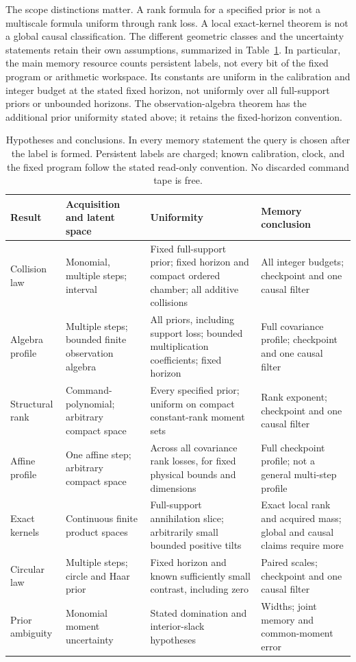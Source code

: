 The scope distinctions matter. A rank formula for a specified prior
is not a multiscale formula uniform through rank loss. A local
exact-kernel theorem is not a global causal classification. The
different geometric classes and the uncertainty statements retain their
own assumptions, summarized in Table~\ref{tab:scope}. In particular,
the main memory resource counts persistent labels, not every bit of
the fixed program or arithmetic workspace. Its constants are uniform
in the calibration and integer budget at the stated fixed horizon,
not uniformly over all full-support priors or unbounded horizons.
The observation-algebra theorem has the additional prior uniformity
stated above; it retains the fixed-horizon convention.

\begin{table}[tbp]
\centering\footnotesize
\setlength{\tabcolsep}{4pt}
\begin{tabular}{@{}p{}p{}p{}p{}@{}}
\toprule
Result & Acquisition and latent space & Uniformity & Memory conclusion\\
\midrule
Collision law & Monomial, multiple steps; interval & Fixed full-support
prior; fixed horizon and compact ordered chamber; all additive collisions
& All integer budgets; checkpoint and one causal filter\\[3pt]
Algebra profile & Multiple steps; bounded finite observation algebra &
All priors, including support loss; bounded multiplication coefficients;
fixed horizon & Full covariance profile; checkpoint and one causal filter\\[3pt]
Structural rank & Command-polynomial; arbitrary compact space & Every
specified prior; uniform on compact constant-rank moment sets & Rank
exponent; checkpoint and one causal filter\\[3pt]
Affine profile & One affine step; arbitrary compact space & Across all
covariance rank losses, for fixed physical bounds and dimensions & Full
checkpoint profile; not a general multi-step profile\\[3pt]
Exact kernels & Continuous finite product spaces & Full-support
annihilation slice; arbitrarily small bounded positive tilts & Exact local
rank and acquired mass; global and causal claims require more\\[3pt]
Circular law & Multiple steps; circle and Haar prior & Fixed horizon and
known sufficiently small contrast, including zero & Paired scales;
checkpoint and one causal filter\\[3pt]
Prior ambiguity & Monomial moment uncertainty & Stated domination and
interior-slack hypotheses & Widths; joint memory and common-moment error\\
\bottomrule
\end{tabular}
\caption{Hypotheses and conclusions. In every memory statement the query
is chosen after the label is formed. Persistent labels are charged;
known calibration, clock, and the fixed program follow the stated
read-only convention. No discarded command tape is free.}
\label{tab:scope}
\end{table}
